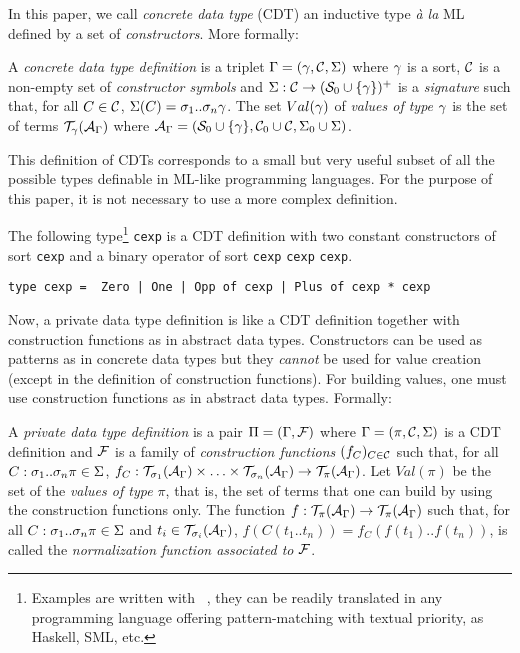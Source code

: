 In this paper, we call {\em concrete data type} (CDT) an inductive
type {\em\`a la} ML defined by a set of {\em constructors}. More
formally:

\begin{dfn}
A {\em concrete data type definition} is a triplet $\Gamma=(\gamma,\mathcal{C},\Sigma)$
where $\gamma$ is a sort, $\mathcal{C}$ is a non-empty set of {\em constructor
symbols} and $\Sigma:\mathcal{C}\rightarrow(\mathcal{S}_0\cup\{\gamma\})^+$ is a {\em signature} such
that, for all $C\in\mathcal{C}$, $\Sigma(C)=\sigma_1..\sigma_n\gamma$. The set $Val(\gamma)$ of
{\em values of type $\gamma$} is the set of terms $\mathcal{T}_\gamma(\mathcal{A}_\Gamma)$ where
$\mathcal{A}_\Gamma=(\mathcal{S}_0\cup\{\gamma\},\mathcal{C}_0\cup\mathcal{C},\Sigma_0\cup\Sigma)$.
\end{dfn}

This definition of CDTs corresponds to a small but very useful subset
of all the possible types definable in ML-like programming
languages. For the purpose of this paper, it is not necessary to use a
more complex definition.

\begin{expl}
The following type\footnote{Examples are written with
\ocaml\ \cite{ocaml3.09}, they can be readily translated in any
programming language offering pattern-matching with textual priority,
as Haskell, SML, etc.} {\tt cexp} is a CDT definition with two
constant constructors of sort {\tt cexp} and a binary operator of sort
{\tt cexp} {\tt cexp} {\tt cexp}.

{\small\begin{verbatim}
type cexp =  Zero | One | Opp of cexp | Plus of cexp * cexp
\end{verbatim}}
\end{expl}


Now, a private data type definition is like a CDT definition together
with construction functions as in abstract data types. Constructors
can be used as patterns as in concrete data types but they {\em
cannot} be used for value creation (except in the definition of
construction functions). For building values, one must use
construction functions as in abstract data types. Formally:

\begin{dfn}
A {\em private data type definition} is a pair $\Pi=(\Gamma,\mathcal{F})$ where
$\Gamma=(\pi,\mathcal{C},\Sigma)$ is a CDT definition and $\mathcal{F}$ is a family of {\em
construction functions} $(f_C)_{C\in\mathcal{C}}$ such that, for all
$C:\sigma_1..\sigma_n\pi\in\Sigma$,
$f_C:\mathcal{T}_{\sigma_1}(\mathcal{A}_\Gamma)\times\ldots\times\mathcal{T}_{\sigma_n}(\mathcal{A}_\Gamma)\rightarrow\mathcal{T}_\pi(\mathcal{A}_\Gamma)$.
Let $Val(\pi)$ be the set of the {\em values of type $\pi$}, that is,
the set of terms that one can build by using the construction
functions only. The function $f:\mathcal{T}_\pi(\mathcal{A}_\Gamma)\rightarrow\mathcal{T}_\pi(\mathcal{A}_\Gamma)$ such
that, for all $C:\sigma_1..\sigma_n\pi\in\Sigma$ and $t_i\in\mathcal{T}_{\sigma_i}(\mathcal{A}_\Gamma)$,
$f(C(t_1..t_n))=f_C(f(t_1)..f(t_n))$, is called the {\em normalization
function associated to $\mathcal{F}$}.
\end{dfn}

